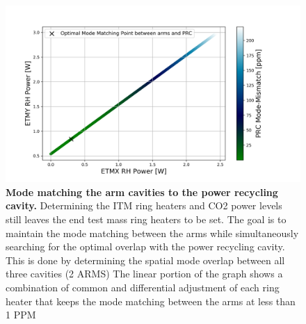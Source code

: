 \begin{figure}[ht]
\centering
\includegraphics[width=1.0 \textwidth]{../Figures/ETM_TCS_Settings.png}
\caption[Mode matching the arm cavities to the power recycling cavity.]{
	\textbf{Mode matching the arm cavities to the power recycling cavity.}  Determining the ITM ring heaters and CO2 power levels still leaves the end test mass ring heaters to be set.  The goal is to maintain the mode matching between the arms while simultaneously searching for the optimal overlap with the power recycling cavity.  This is done by determining the spatial mode overlap between all three cavities (2 ARMS) The linear portion of the graph shows a combination of common and differential adjustment of each ring heater that keeps the mode matching between the arms at less than 1 PPM 
	}
\label{fig:TCS_ETM}
\end{figure}